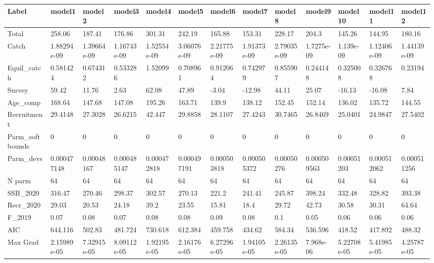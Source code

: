 \captionsetup[table]{labelformat=empty,skip=1pt}
\begin{longtable}{lllllllllllll}
\toprule
Label & model1 & model2 & model3 & model4 & model5 & model6 & model7 & model8 & model9 & model10 & model11 & model12 \\ 
\midrule
Total & 258.06 & 187.41 & 176.86 & 301.31 & 242.19 & 165.88 & 153.31 & 228.17 & 204.3 & 145.26 & 144.95 & 180.16 \\ 
Catch & 1.88294e-09 & 1.39664e-09 & 1.16743e-09 & 1.52554e-09 & 3.06076e-09 & 2.21775e-09 & 1.91373e-09 & 2.79035e-09 & 1.7275e-09 & 1.139e-09 & 1.12406e-09 & 1.44139e-09 \\ 
Equil\_catch & 0.581424 & 0.674312 & 0.533286 & 1.52099 & 0.708961 & 0.912064 & 0.742979 & 0.855907 & 0.244148 & 0.325008 & 0.326768 & 0.23194 \\ 
Survey & 59.42 & 11.76 & 2.63 & 62.08 & 47.89 & -3.04 & -12.98 & 44.11 & 25.07 & -16.13 & -16.08 & 7.84 \\ 
Age\_comp & 168.64 & 147.68 & 147.08 & 195.26 & 163.71 & 139.9 & 138.12 & 152.45 & 152.14 & 136.02 & 135.72 & 144.55 \\ 
Recruitment & 29.4148 & 27.3028 & 26.6215 & 42.447 & 29.8858 & 28.1107 & 27.4243 & 30.7465 & 26.8469 & 25.0401 & 24.9847 & 27.5402 \\ 
Parm\_softbounds & 0 & 0 & 0 & 0 & 0 & 0 & 0 & 0 & 0 & 0 & 0 & 0 \\ 
Parm\_devs & 0.000477148 & 0.00048167 & 0.000485147 & 0.000472818 & 0.000497191 & 0.000503818 & 0.000505372 & 0.00050276 & 0.000509563 & 0.00051203 & 0.000512062 & 0.000511256 \\ 
N parm & 64 & 64 & 64 & 64 & 64 & 64 & 64 & 64 & 64 & 64 & 64 & 64 \\ 
SSB\_2020 & 316.47 & 270.46 & 298.37 & 302.57 & 270.13 & 221.2 & 241.41 & 245.87 & 398.24 & 332.48 & 328.82 & 393.38 \\ 
Recr\_2020 & 29.03 & 20.53 & 24.18 & 39.2 & 23.55 & 15.81 & 18.4 & 29.72 & 42.73 & 30.58 & 30.31 & 64.64 \\ 
F\_2019 & 0.07 & 0.08 & 0.07 & 0.08 & 0.08 & 0.09 & 0.08 & 0.1 & 0.05 & 0.06 & 0.06 & 0.06 \\ 
AIC & 644.116 & 502.83 & 481.724 & 730.618 & 612.384 & 459.758 & 434.62 & 584.34 & 536.596 & 418.52 & 417.892 & 488.32 \\ 
Max Grad & 2.15989e-05 & 7.32915e-05 & 8.09112e-05 & 1.92195e-05 & 2.16176e-05 & 6.27296e-05 & 1.94105e-05 & 2.26135e-05 & 7.968e-06 & 5.22708e-05 & 5.41985e-05 & 4.25787e-05 \\ 
\bottomrule
\end{longtable}

